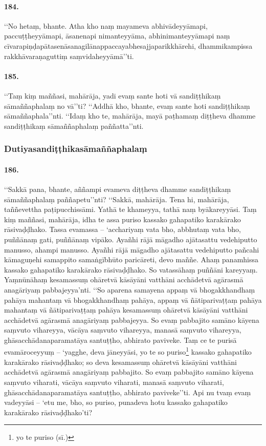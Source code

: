 \paragraph{184.} ‘‘No hetaṃ, bhante. Atha kho naṃ mayameva abhivādeyyāmapi, paccuṭṭheyyāmapi, āsanenapi nimanteyyāma, abhinimanteyyāmapi naṃ cīvarapiṇḍapātasenāsanagilānappaccayabhesajjaparikkhārehi, dhammikampissa rakkhāvaraṇaguttiṃ saṃvidaheyyāmā’’ti.

\paragraph{185.} ‘‘Taṃ kiṃ maññasi, mahārāja, yadi evaṃ sante hoti vā sandiṭṭhikaṃ sāmaññaphalaṃ no vā’’ti? ‘‘Addhā kho, bhante, evaṃ sante hoti sandiṭṭhikaṃ sāmaññaphala’’nti. ‘‘Idaṃ kho te, mahārāja, mayā paṭhamaṃ diṭṭheva dhamme sandiṭṭhikaṃ sāmaññaphalaṃ paññatta’’nti.

\subsubsection{Dutiyasandiṭṭhikasāmaññaphalaṃ}

\paragraph{186.} ‘‘Sakkā pana, bhante, aññampi evameva diṭṭheva dhamme sandiṭṭhikaṃ sāmaññaphalaṃ paññapetu’’nti? ‘‘Sakkā, mahārāja. Tena hi, mahārāja, taññevettha paṭipucchissāmi. Yathā te khameyya, tathā naṃ byākareyyāsi. Taṃ kiṃ maññasi, mahārāja, idha te assa puriso kassako gahapatiko karakārako rāsivaḍḍhako. Tassa evamassa – ‘acchariyaṃ vata bho, abbhutaṃ vata bho, puññānaṃ gati, puññānaṃ vipāko. Ayañhi rājā māgadho ajātasattu vedehiputto manusso, ahampi manusso. Ayañhi rājā māgadho ajātasattu vedehiputto pañcahi kāmaguṇehi samappito samaṅgībhūto paricāreti, devo maññe. Ahaṃ panamhissa kassako gahapatiko karakārako rāsivaḍḍhako. So vatassāhaṃ puññāni kareyyaṃ. Yaṃnūnāhaṃ kesamassuṃ ohāretvā kāsāyāni vatthāni acchādetvā agārasmā anagāriyaṃ pabbajeyya’nti. ‘‘So aparena samayena appaṃ vā bhogakkhandhaṃ pahāya mahantaṃ vā bhogakkhandhaṃ pahāya, appaṃ vā ñātiparivaṭṭaṃ pahāya mahantaṃ vā ñātiparivaṭṭaṃ pahāya kesamassuṃ ohāretvā kāsāyāni vatthāni acchādetvā agārasmā anagāriyaṃ pabbajeyya. So evaṃ pabbajito samāno kāyena saṃvuto vihareyya, vācāya saṃvuto vihareyya, manasā saṃvuto vihareyya, ghāsacchādanaparamatāya santuṭṭho, abhirato paviveke. Taṃ ce te purisā evamāroceyyuṃ – ‘yagghe, deva jāneyyāsi, yo te so puriso\footnote{yo te puriso (sī.)} kassako gahapatiko karakārako rāsivaḍḍhako; so deva kesamassuṃ ohāretvā kāsāyāni vatthāni acchādetvā agārasmā anagāriyaṃ pabbajito. So evaṃ pabbajito samāno kāyena saṃvuto viharati, vācāya saṃvuto viharati, manasā saṃvuto viharati, ghāsacchādanaparamatāya santuṭṭho, abhirato paviveke’’ti. Api nu tvaṃ evaṃ vadeyyāsi – ‘etu me, bho, so puriso, punadeva hotu kassako gahapatiko karakārako rāsivaḍḍhako’ti?


